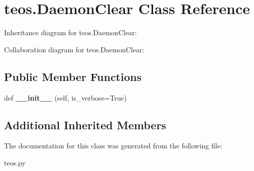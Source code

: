 \hypertarget{classteos_1_1DaemonClear}{}\section{teos.\+Daemon\+Clear Class Reference}
\label{classteos_1_1DaemonClear}


Inheritance diagram for teos.\+Daemon\+Clear\+:


Collaboration diagram for teos.\+Daemon\+Clear\+:
\subsection*{Public Member Functions}
\begin{DoxyCompactItemize}
\item 
\mbox{\label{classteos_1_1DaemonClear_a0f2cec01706c5f3a348641047e1fe533}} 
def {\bfseries \+\_\+\+\_\+init\+\_\+\+\_\+} (self, is\+\_\+verbose=True)
\end{DoxyCompactItemize}
\subsection*{Additional Inherited Members}


The documentation for this class was generated from the following file\+:\begin{DoxyCompactItemize}
\item 
teos.\+py\end{DoxyCompactItemize}
